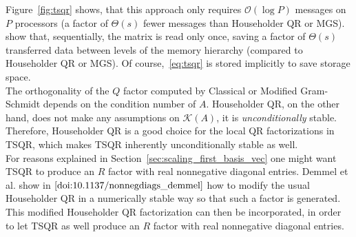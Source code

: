 \documentclass{scrartcl}
\numberwithin{equation}{section}
\begin{document}
Figure~\ref{fig:tsqr} shows, that this approach only requires $\mathcal{O}(\log P)$ messages on $P$ processors (a factor of $\Theta (s)$ fewer messages than Householder QR or MGS). \cite{Demmel:2012:CA-QR_demmel} show that, sequentially, the matrix is read only once, saving a factor of $\Theta(s)$ transferred data between levels of the memory hierarchy (compared to Householder QR or MGS). 
Of course,~\eqref{eq:tsqr} is stored implicitly to save storage space.\\
The orthogonality of the $Q$ factor computed by Classical or Modified Gram-Schmidt depends on the condition number of $A$. Householder QR, on the other hand, does not make any assumptions on $\mathcal{K}(A)$, it is \textit{unconditionally} stable. Therefore, Householder QR is a good choice for the local QR factorizations in TSQR, which makes TSQR inherently unconditionally stable as well.\\

For reasons explained in Section~\ref{sec:scaling_first_basis_vec} one might want TSQR to produce an $R$ factor with real nonnegative diagonal entries. Demmel et al. show in $\cite{doi:10.1137/nonnegdiags_demmel} $ how to modify the usual Householder QR in a numerically stable way so that such a factor is generated. This modified Householder QR factorization can then be incorporated, in order to let TSQR as well produce an $R$ factor with real nonnegative diagonal entries.
\end{document}
